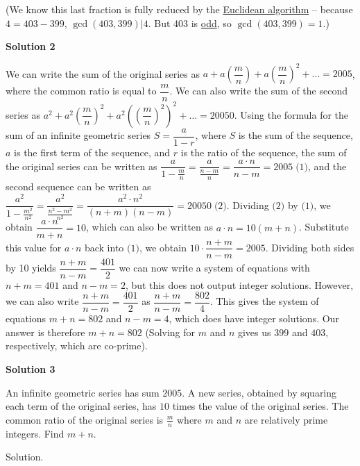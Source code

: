 \begin{enumerate}
 (We know this last fraction is fully reduced by the \href{https://artofproblemsolving.com/wiki/index.php?title=Euclidean\_algorithm}{Euclidean algorithm} -- because $4 = 403 - 399$, $\gcd(403, 399) | 4$.  But 403 is \href{https://artofproblemsolving.com/wiki/index.php?title=Odd\_integer}{ odd}, so $\gcd(403, 399) = 1$.)

 



\textbf{Solution 2}

We can write the sum of the original series as $a + a\left(\dfrac{m}{n}\right) + a\left(\dfrac{m}{n}\right)^2 + \ldots = 2005$, where the common ratio is equal to $\dfrac{m}{n}$. We can also write the sum of the second series as $a^2 + a^2\left(\dfrac{m}{n}\right)^2 + a^2\left(\left(\dfrac{m}{n}\right)^2\right)^2 + \ldots = 20050$. Using the formula for the sum of an infinite geometric series $S=\dfrac{a}{1-r}$, where $S$ is the sum of the sequence, $a$ is the first term of the sequence, and $r$ is the ratio of the sequence, the sum of the original series can be written as $\dfrac{a}{1-\frac{m}{n}}=\dfrac{a}{\frac{n-m}{n}}=\dfrac{a \cdot n}{n-m}=2005\;\text{(1)}$, and the second sequence can be written as $\dfrac{a^2}{1-\frac{m^2}{n^2}}=\dfrac{a^2}{\frac{n^2-m^2}{n^2}}=\dfrac{a^2\cdot n^2}{(n+m)(n-m)}=20050\;\text{(2)}$. Dividing $\text{(2)}$ by $\text{(1)}$, we obtain $\dfrac{a\cdot n}{m+n}=10$, which can also be written as $a\cdot n=10(m+n)$. Substitute this value for $a\cdot n$ back into $\text{(1)}$, we obtain $10\cdot \dfrac{n+m}{n-m}=2005$. Dividing both sides by 10 yields $\dfrac{n+m}{n-m}=\dfrac{401}{2}$ we can now write a system of equations with $n+m=401$ and $n-m=2$, but this does not output integer solutions. However, we can also write $\dfrac{n+m}{n-m}=\dfrac{401}{2}$ as $\dfrac{n+m}{n-m}=\dfrac{802}{4}$. This gives the system of equations $m+n=802$ and $n-m=4$, which does have integer solutions. Our answer is therefore $m+n=\boxed{802}$ (Solving for $m$ and $n$ gives us $399$ and $403$, respectively, which are co-prime).

 



\textbf{Solution 3}

An infinite geometric series has sum $2005$. A new series, obtained by squaring each term of the original series, has $10$ times the value of the original series. The common ratio of the original series is $\frac{m}{n}$ where $m$ and $n$ are relatively prime integers. Find $m+n.$

 Solution.


\end{enumerate}
